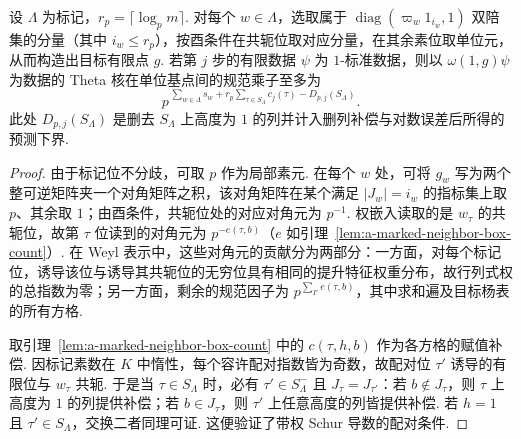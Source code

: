 \begin{lemma}[标记双陪集点处的单步规范]
\label{lem:a-marked-neighbor-jet-gauge}
\emitthmsource
设 $\Lambda$ 为标记，$r_p=\lceil\log_p m\rceil$. 对每个 $w\in\Lambda$，选取属于 $\operatorname{diag}(\varpi_w1_{i_w},1)$ 双陪集的分量（其中 $i_w\le r_p$），按酉条件在共轭位取对应分量，在其余素位取单位元，从而构造出目标有限点 $g$. 若第 $j$ 步的有限数据 $\psi$ 为 $1$-标准数据，则以 $\omega(1,g)\psi$ 为数据的 Theta 核在单位基点间的规范乘子至多为
\[
 p^{\,\sum_{w\in\Lambda}s_w+
      r_p\sum_{\tau\in S_\Lambda}c_j(\tau)-D_{p,j}(S_\Lambda)}.
\]
此处 $D_{p,j}(S_\Lambda)$ 是删去 $S_\Lambda$ 上高度为 $1$ 的列并计入删列补偿与对数误差后所得的预测下界.
\end{lemma}
\begin{proof}
由于标记位不分歧，可取 $p$ 作为局部素元. 在每个 $w$ 处，可将 $g_w$ 写为两个整可逆矩阵夹一个对角矩阵之积，该对角矩阵在某个满足 $|J_w|=i_w$ 的指标集上取 $p$、其余取 $1$；由酉条件，共轭位处的对应对角元为 $p^{-1}$. 权嵌入读取的是 $w_\tau$ 的共轭位，故第 $\tau$ 位读到的对角元为 $p^{-e(\tau,b)}$（$e$ 如引理~\ref{lem:a-marked-neighbor-box-count}）. 在 Weyl 表示中，这些对角元的贡献分为两部分：一方面，对每个标记位，诱导该位与诱导其共轭位的无穷位具有相同的提升特征权重分布，故行列式权的总指数为零；另一方面，剩余的规范因子为 $p^{\sum_{I'} e(\tau,b)}$，其中求和遍及目标杨表的所有方格.

取引理~\ref{lem:a-marked-neighbor-box-count} 中的 $c(\tau,h,b)$ 作为各方格的赋值补偿. 因标记素数在 $K$ 中惰性，每个容许配对指数皆为奇数，故配对位 $\tau'$ 诱导的有限位与 $w_\tau$ 共轭. 于是当 $\tau\in S_\Lambda$ 时，必有 $\tau'\in S_\Lambda^-$ 且 $J_\tau=J_{\tau'}$：若 $b\notin J_\tau$，则 $\tau$ 上高度为 $1$ 的列提供补偿；若 $b\in J_\tau$，则 $\tau'$ 上任意高度的列皆提供补偿. 若 $h=1$ 且 $\tau'\in S_\Lambda$，交换二者同理可证. 这便验证了带权 Schur 导数的配对条件.


\end{proof}
